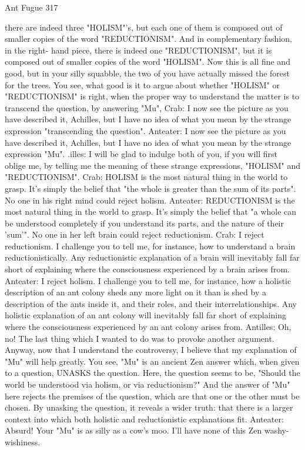 Ant Fugue                                                                              317

    there are indeed three "HOLISM"'s, but each one of them is composed out of smaller
    copies of the word "REDUCTIONISM". And in complementary fashion, in the right-
    hand piece, there is indeed one "REDUCTIONISM", but it is composed out of
    smaller copies of the word "HOLISM". Now this is all fine and good, but in your
    silly squabble, the two of you have actually missed the forest for the trees. You see,
    what good is it to argue about whether "HOLISM" or "REDUCTIONISM" is right,
    when the proper way to understand the matter is to transcend the question, by
    answering "Mu",
Crab: I now see the picture as you have described it, Achilles, but I have no idea of what
    you mean by the strange expression "transcending the question".
Anteater: I now see the picture as you have described it, Achilles, but I have no idea of
    what you mean by the strange expression "Mu". .illes: I will be glad to indulge both
    of you, if you will first oblige me, by telling me the meaning of these strange
    expressions, "HOLISM" and "REDUCTIONISM".
Crab: HOLISM is the most natural thing in the world to grasp. It's simply the belief that
    "the whole is greater than the sum of its parts". No one in his right mind could reject
    holism.
Anteater: REDUCTIONISM is the most natural thing in the world to grasp. It's simply
    the belief that "a whole can be understood completely if you understand its parts, and
    the nature of their 'sum'". No one in her left brain could reject reductionism.
Crab: I reject reductionism. I challenge you to tell me, for instance, how to understand a
    brain reductionistically. Any reductionistic explanation of a brain will inevitably fall
    far short of explaining where the consciousness experienced by a brain arises from.
Anteater: I reject holism. I challenge you to tell me, for instance, how a holistic
    description of an ant colony sheds any more light on it than is shed by a description
    of the ants inside it, and their roles, and their interrelationships. Any holistic
    explanation of an ant colony will inevitably fall far short of explaining where the
    consciousness experienced by an ant colony arises from.
Antilles: Oh, no! The last thing which I wanted to do was to provoke another argument.
    Anyway, now that I understand the controversy, I believe that my explanation of
    "Mu" will help greatly. You see, "Mu" is an ancient Zen answer which, when given
    to a question, UNASKS the question. Here, the question seems to be, "Should the
    world be understood via holism, or via reductionism?" And the answer of "Mu" here
    rejects the premises of the question, which are that one or the other must be chosen.
    By unasking the question, it reveals a wider truth: that there is a larger context into
    which both holistic and reductionistic explanations fit.
Anteater: Absurd! Your "Mu" is as silly as a cow's moo. I'll have none of this Zen washy-
    wishiness.




